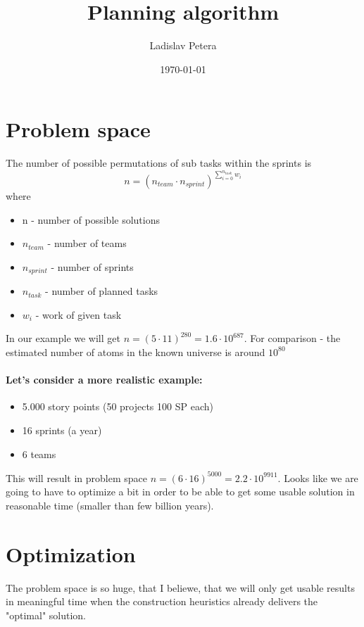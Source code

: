 \documentclass[10pt,a4paper]{article}
\title{Planning algorithm}
\author{Ladislav Petera}
\date{\today}
\begin{document}
\maketitle

\section{Problem space}

The number of possible permutations of sub tasks within the sprints is
$$n = (n_{team} \cdot n_{sprint}) ^{\sum_{i=0}^{n_{task}}{w_i}} $$ where
\begin{itemize}
\item n - number of possible solutions
\item $n_{team}$ - number of teams
\item $n_{sprint}$ - number of sprints
\item $n_{task}$ - number of planned tasks
\item $w_i$ - work of given task
\end{itemize}

In our example we will get $n = (5 \cdot 11) ^{280} = 1.6 \cdot 10^{687}$.
For comparison - the estimated number of atoms in the known universe is around $10^{80}$

\paragraph{Let's consider a more realistic example:}

\begin{itemize}
\item 5.000 story points (50 projects 100 SP each)
\item 16 sprints (a year)
\item 6 teams
\end{itemize}

This will result in problem space $n = (6 \cdot 16) ^{5000} = 2.2 \cdot 10^{9911}$.
Looks like we are going to have to optimize a bit in order to be able to get some usable solution in reasonable time (smaller than few billion years).

\section{Optimization}

The problem space is so huge, that I beliewe, that we will only get usable results in meaningful time when the construction heuristics already delivers the "optimal" solution.
\end{document}
